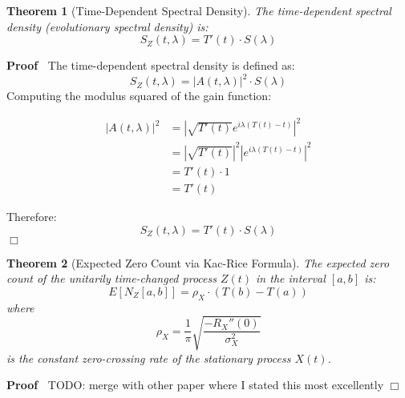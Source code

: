 \documentclass{article}
\newenvironment{proof}{\noindent\textbf{Proof\ }}{\hspace*{\fill}$\Box$\medskip}
\newtheorem{theorem}{Theorem}
\begin{document}
\begin{theorem}
  [Time-Dependent Spectral Density] The time-dependent spectral density
  (evolutionary spectral density) is:
  \[ S_Z (t, \lambda) = T' (t) \cdot S (\lambda) \]
\end{theorem}

\begin{proof}
  The time-dependent spectral density is defined as:
  \begin{equation}
    S_Z (t, \lambda) = |A (t, \lambda) |^2 \cdot S (\lambda)
  \end{equation}
  Computing the modulus squared of the gain function:
  
  \begin{align}
    |A (t, \lambda) |^2 & = \left| \sqrt{T' (t)} e^{i \lambda (T (t) - t)}
    \right|^2 \\
    & = \left| \sqrt{T' (t)} \right|^2 | e^{i \lambda (T (t) - t)} |^2 \\
    & = T' (t) \cdot 1 \\
    & = T' (t) 
  \end{align}
  
  Therefore:
  \begin{equation}
    S_Z (t, \lambda) = T' (t) \cdot S (\lambda)
  \end{equation}
\end{proof}

\begin{theorem}
  [Expected Zero Count via Kac-Rice Formula] The expected zero count of the
  unitarily time-changed process $Z (t)$ in the interval $[a, b]$ is:
  \begin{equation}
    E [N_Z [a, b]] = \rho_X \cdot (T (b) - T (a))
  \end{equation}
  where
  \begin{equation}
    \rho_X = \frac{1}{\pi}  \sqrt{\frac{- R_X'' (0)}{\sigma_X^2}}
  \end{equation}
  is the constant zero-crossing rate of the stationary process $X (t)$.
\end{theorem}

\begin{proof}
  TODO: merge with other paper where I stated this most excellently 
\end{proof}
\end{document}
